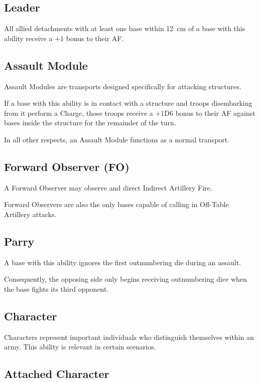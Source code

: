 \subsection{Leader}

All allied detachments with at least one base within 12~cm of a base with this ability receive a $+1$ bonus to their AF.

\subsection{Assault Module}

Assault Modules are transports designed specifically for attacking structures.

If a base with this ability is in contact with a structure and troops disembarking from it perform a Charge, those troops receive a $+1$D6 bonus to their AF against bases inside the structure for the remainder of the turn.

In all other respects, an Assault Module functions as a normal transport.

\subsection{Forward Observer (FO)}

A Forward Observer may observe and direct Indirect Artillery Fire.

Forward Observers are also the only bases capable of calling in Off-Table Artillery attacks.

\subsection{Parry}

A base with this ability ignores the first outnumbering die during an assault.

Consequently, the opposing side only begins receiving outnumbering dice when the base fights its third opponent.

\subsection{Character}

Characters represent important individuals who distinguish themselves within an army. This ability is relevant in certain scenarios.

\subsection{Attached Character}

